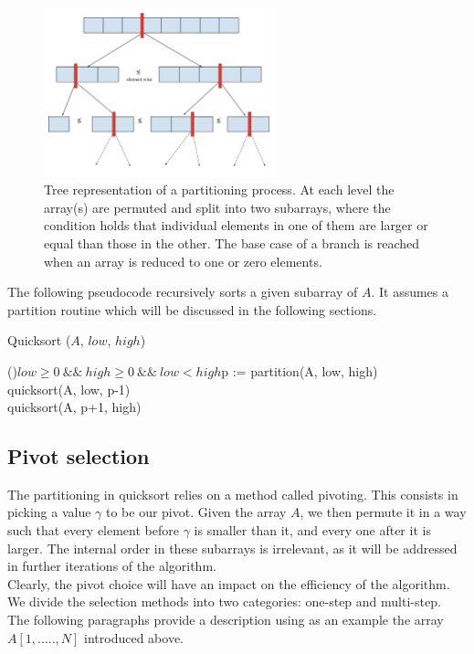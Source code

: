 \documentclass[]{finalproject}
\begin{document}
\begin{figure}[H]
    \centering
    \includegraphics[width=0.6\textwidth]{recursive_partitioning.png}
    \caption{Tree representation of a partitioning process. 
    At each level the array(s) are permuted and split into two subarrays, where the condition holds that individual elements in one of them are larger or equal than those in the other.
    The base case of a branch is reached when an array is reduced to one or zero elements.}
    \label{fig:rec-part}
\end{figure}

The following pseudocode recursively sorts a given subarray of $A$. It assumes a partition routine which will be discussed in the following sections.

\begin{algorithm}
	\caption{Quicksort ($A$, $low$, $high$)}
	\label{alg:p1}
	\If(){$low \geq 0 ~\&\&~ high \geq 0 ~\&\&~ low < high$}{p := partition(A, low, high)\\
	quicksort(A, low, p-1)\\
	quicksort(A, p+1, high)}
\end{algorithm}


\subsection{Pivot selection}
The partitioning in quicksort relies on a method called pivoting. This consists in picking a value $\gamma$ to be our pivot. Given the array $A$, we then permute it in a way such that every element before $\gamma$ is smaller than it, and every one after it is larger. The internal order in these subarrays is irrelevant, as it will be addressed in further iterations of the algorithm.\\
Clearly, the pivot choice will have an impact on the efficiency of the algorithm. We divide the selection methods into two categories: one-step and multi-step.\\
The following paragraphs provide a description using as an example the array $A[1,.....,N]$ introduced above.
\end{document}
